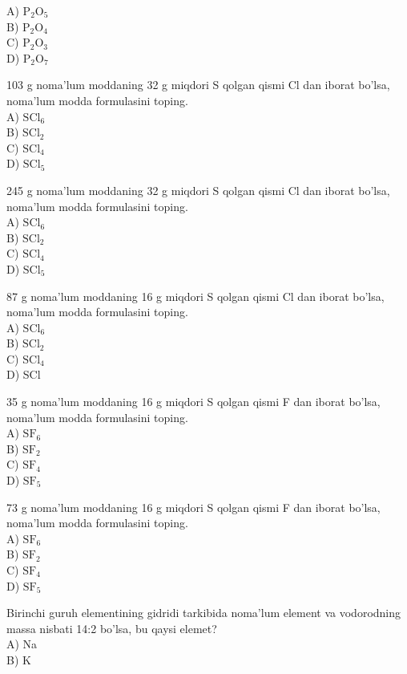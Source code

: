 A) $\mathrm{P}_{2} \mathrm{O}_{5}$\\
B) $\mathrm{P}_{2} \mathrm{O}_{4}$\\
C) $\mathrm{P}_{2} \mathrm{O}_{3}$\\
D) $\mathrm{P}_{2} \mathrm{O}_{7}$
  \item 103 g noma'lum moddaning 32 g miqdori S qolgan qismi Cl dan iborat bo'lsa, noma'lum modda formulasini toping.\\
A) $\mathrm{SCl}_{6}$\\
B) $\mathrm{SCl}_{2}$\\
C) $\mathrm{SCl}_{4}$\\
D) $\mathrm{SCl}_{5}$
  \item 245 g noma'lum moddaning 32 g miqdori S qolgan qismi Cl dan iborat bo'lsa, noma'lum modda formulasini toping.\\
A) $\mathrm{SCl}_{6}$\\
B) $\mathrm{SCl}_{2}$\\
C) $\mathrm{SCl}_{4}$\\
D) $\mathrm{SCl}_{5}$
  \item 87 g noma'lum moddaning 16 g miqdori S qolgan qismi Cl dan iborat bo'lsa, noma'lum modda formulasini toping.\\
A) $\mathrm{SCl}_{6}$\\
B) $\mathrm{SCl}_{2}$\\
C) $\mathrm{SCl}_{4}$\\
D) SCl
  \item 35 g noma'lum moddaning 16 g miqdori S qolgan qismi F dan iborat bo'lsa, noma'lum modda formulasini toping.\\
A) $\mathrm{SF}_{6}$\\
B) $\mathrm{SF}_{2}$\\
C) $\mathrm{SF}_{4}$\\
D) $\mathrm{SF}_{5}$
  \item 73 g noma'lum moddaning 16 g miqdori S qolgan qismi F dan iborat bo'lsa, noma'lum modda formulasini toping.\\
A) $\mathrm{SF}_{6}$\\
B) $\mathrm{SF}_{2}$\\
C) $\mathrm{SF}_{4}$\\
D) $\mathrm{SF}_{5}$
  \item Birinchi guruh elementining gidridi tarkibida noma'lum element va vodorodning massa nisbati 14:2 bo'lsa, bu qaysi elemet?\\
A) Na\\
B) K\\
